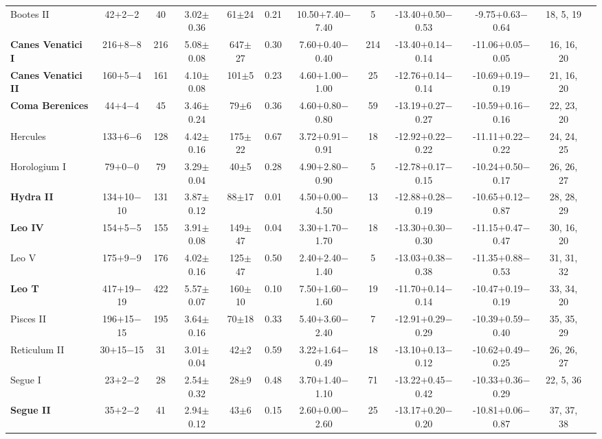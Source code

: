 \begin{table*}
\begin{center}
{\begin{tabular}{lccccccccccc}
Bootes II & 42$+$2$-$2 & 40 & 3.02$\pm$0.36 & 61$\pm$24 & 0.21 & 10.50$+$7.40$-$7.40 & 5 & -13.40$+$0.50$-$0.53 & -9.75$+$0.63$-$0.64 & 18, 5, 19\\
\textbf{Canes Venatici I} & 216$+$8$-$8 & 216 & 5.08$\pm$0.08 & 647$\pm$27 & 0.30 & 7.60$+$0.40$-$0.40 & 214 & -13.40$+$0.14$-$0.14 & -11.06$+$0.05$-$0.05 & 16, 16, 20\\
\textbf{Canes Venatici II} & 160$+$5$-$4 & 161 & 4.10$\pm$0.08 & 101$\pm$5 & 0.23 & 4.60$+$1.00$-$1.00 & 25 & -12.76$+$0.14$-$0.14 & -10.69$+$0.19$-$0.19 & 21, 16, 20\\
\textbf{Coma Berenices} & 44$+$4$-$4 & 45 & 3.46$\pm$0.24 & 79$\pm$6 & 0.36 & 4.60$+$0.80$-$0.80 & 59 & -13.19$+$0.27$-$0.27 & -10.59$+$0.16$-$0.16 & 22, 23, 20\\
Hercules & 133$+$6$-$6 & 128 & 4.42$\pm$0.16 & 175$\pm$22 & 0.67 & 3.72$+$0.91$-$0.91 & 18 & -12.92$+$0.22$-$0.22 & -11.11$+$0.22$-$0.22 & 24, 24, 25\\
Horologium I & 79$+$0$-$0 & 79 & 3.29$\pm$0.04 & 40$\pm$5 & 0.28 & 4.90$+$2.80$-$0.90 & 5 & -12.78$+$0.17$-$0.15 & -10.24$+$0.50$-$0.17 & 26, 26, 27\\
\textbf{Hydra II} & 134$+$10$-$10 & 131 & 3.87$\pm$0.12 & 88$\pm$17 & 0.01 & 4.50$+$0.00$-$4.50 & 13 & -12.88$+$0.28$-$0.19 & -10.65$+$0.12$-$0.87 & 28, 28, 29\\
\textbf{Leo IV} & 154$+$5$-$5 & 155 & 3.91$\pm$0.08 & 149$\pm$47 & 0.04 & 3.30$+$1.70$-$1.70 & 18 & -13.30$+$0.30$-$0.30 & -11.15$+$0.47$-$0.47 & 30, 16, 20\\
Leo V & 175$+$9$-$9 & 176 & 4.02$\pm$0.16 & 125$\pm$47 & 0.50 & 2.40$+$2.40$-$1.40 & 5 & -13.03$+$0.38$-$0.38 & -11.35$+$0.88$-$0.53 & 31, 31, 32\\
\textbf{Leo T} & 417$+$19$-$19 & 422 & 5.57$\pm$0.07 & 160$\pm$10 & 0.10 & 7.50$+$1.60$-$1.60 & 19 & -11.70$+$0.14$-$0.14 & -10.47$+$0.19$-$0.19 & 33, 34, 20\\
Pisces II & 196$+$15$-$15 & 195 & 3.64$\pm$0.16 & 70$\pm$18 & 0.33 & 5.40$+$3.60$-$2.40 & 7 & -12.91$+$0.29$-$0.29 & -10.39$+$0.59$-$0.40 & 35, 35, 29\\
Reticulum II & 30$+$15$-$15 & 31 & 3.01$\pm$0.04 & 42$\pm$2 & 0.59 & 3.22$+$1.64$-$0.49 & 18 & -13.10$+$0.13$-$0.12 & -10.62$+$0.49$-$0.25 & 26, 26, 27\\
Segue I & 23$+$2$-$2 & 28 & 2.54$\pm$0.32 & 28$\pm$9 & 0.48 & 3.70$+$1.40$-$1.10 & 71 & -13.22$+$0.45$-$0.42 & -10.33$+$0.36$-$0.29 & 22, 5, 36\\
\textbf{Segue II} & 35$+$2$-$2 & 41 & 2.94$\pm$0.12 & 43$\pm$6 & 0.15 & 2.60$+$0.00$-$2.60 & 25 & -13.17$+$0.20$-$0.20 & -10.81$+$0.06$-$0.87 & 37, 37, 38\\

\end{tabular}}
\end{center}
\end{table*}
